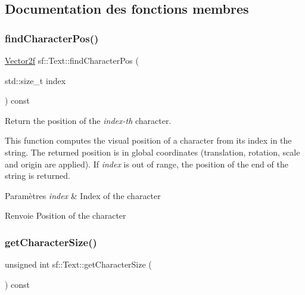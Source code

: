\subsection{Documentation des fonctions membres}
\mbox{\label{classsf_1_1Text_a2e252d8dcae3eb61c6c962c0bc674b12}} 
\subsubsection{\texorpdfstring{find\+Character\+Pos()}{findCharacterPos()}}
{\footnotesize\ttfamily \hyperlink{classsf_1_1Vector2}{Vector2f} sf\+::\+Text\+::find\+Character\+Pos (\begin{DoxyParamCaption}\item[{std\+::size\+\_\+t}]{index }\end{DoxyParamCaption}) const}



Return the position of the {\itshape index-\/th} character. 

This function computes the visual position of a character from its index in the string. The returned position is in global coordinates (translation, rotation, scale and origin are applied). If {\itshape index} is out of range, the position of the end of the string is returned.


\begin{DoxyParams}{Paramètres}
{\em index} & Index of the character\\
\hline
\end{DoxyParams}
\begin{DoxyReturn}{Renvoie}
Position of the character 
\end{DoxyReturn}
\mbox{\label{classsf_1_1Text_a46d1d7f1d513bb8d434e985a93ea5224}} 
\subsubsection{\texorpdfstring{get\+Character\+Size()}{getCharacterSize()}}
{\footnotesize\ttfamily unsigned int sf\+::\+Text\+::get\+Character\+Size (\begin{DoxyParamCaption}{ }\end{DoxyParamCaption}) const}



